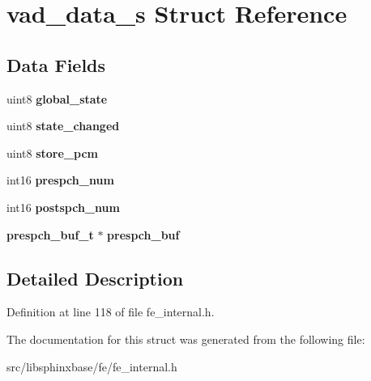 \section{vad\-\_\-data\-\_\-s Struct Reference}
\label{structvad__data__s}
\subsection*{Data Fields}
\begin{DoxyCompactItemize}
\item 
uint8 {\bfseries global\-\_\-state}\label{structvad__data__s_ac320029ecef22bd8856e7d12b10f3219}

\item 
uint8 {\bfseries state\-\_\-changed}\label{structvad__data__s_a3b62819ebfc3c5d06284d69b1604c289}

\item 
uint8 {\bfseries store\-\_\-pcm}\label{structvad__data__s_acfbbce04315dd3b9d3a109c76cd86e81}

\item 
int16 {\bfseries prespch\-\_\-num}\label{structvad__data__s_a6e7e7794d61eb74155058da0b9f40d78}

\item 
int16 {\bfseries postspch\-\_\-num}\label{structvad__data__s_abb3bf6c510b83b30056100fe4d281a49}

\item 
{\bf prespch\-\_\-buf\-\_\-t} $\ast$ {\bfseries prespch\-\_\-buf}\label{structvad__data__s_a940abb6ae872a35dc8a7f405e5e7a6a6}

\end{DoxyCompactItemize}


\subsection{Detailed Description}


Definition at line 118 of file fe\-\_\-internal.\-h.



The documentation for this struct was generated from the following file\-:\begin{DoxyCompactItemize}
\item 
src/libsphinxbase/fe/fe\-\_\-internal.\-h\end{DoxyCompactItemize}
